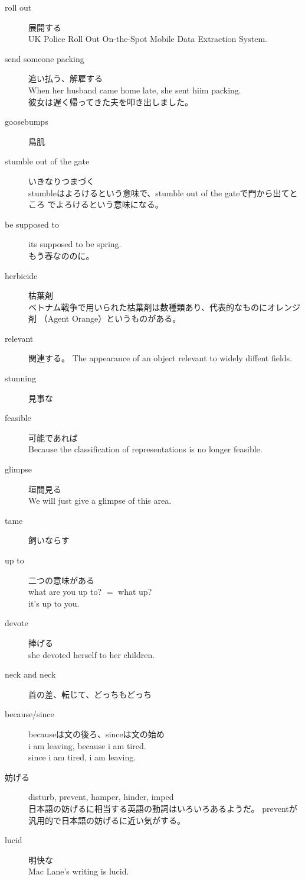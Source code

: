 \begin{description}
		\item[roll out] 展開する \\
		UK Police Roll Out On-the-Spot Mobile Data Extraction System.
		\item[send someone packing] 追い払う、解雇する \\
		When her husband came home late, she sent hiim packing. \\
		彼女は遅く帰ってきた夫を叩き出しました。
		\item[goosebumps] 鳥肌
		\item[stumble out of the gate] いきなりつまづく \\
		stumbleはよろけるという意味で、stumble out of the gateで門から出てところ
		でよろけるという意味になる。
		\item[be supposed to] its supposed to be spring. \\
		もう春なののに。
		\item[herbicide] 枯葉剤 \\
		ベトナム戦争で用いられた枯葉剤は数種類あり、代表的なものにオレンジ剤
		（Agent Orange）というものがある。
		\item[relevant] 関連する。
		The appearance of an object relevant to widely diffent fields.
		\item[stunning] 見事な
		\item[feasible] 可能であれば \\
		Because the classification of representations is no longer feasible.
		\item[glimpse] 垣間見る \\
		We will just give a glimpse of this area.
		\item[tame] 飼いならす \\
		\item[up to] 二つの意味がある \\
		what are you up to? $=$  what up? \\
		it's up to you.
		\item[devote] 捧げる \\
		she devoted herself to her children.
		\item[neck and neck] 首の差、転じて、どっちもどっち \\
		\item[because/since] becauseは文の後ろ、sinceは文の始め \\
		i am leaving, because i am tired. \\
		since i am tired,  i am leaving.
		\item[妨げる] disturb, prevent, hamper, hinder, imped \\
		日本語の妨げるに相当する英語の動詞はいろいろあるようだ。
		preventが汎用的で日本語の妨げるに近い気がする。
		\item[lucid] 明快な \\
		Mac Lane's writing is lucid.
	\end{description} %

